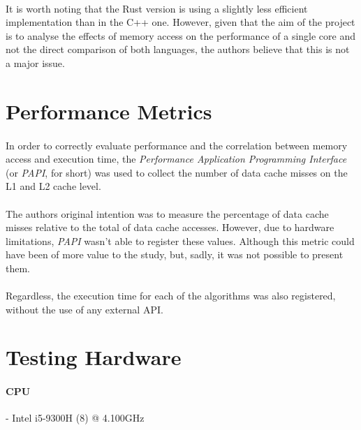 \documentclass{report}
\begin{document}
		\paragraph{}It is worth noting that the Rust version is using a slightly less efficient implementation than in the C++ one. However, given that the aim of the project is to analyse the effects of memory access on the performance of a single core and not the direct comparison of both languages, the authors believe that this is not a major issue.
	
		\section{Performance Metrics}
		
			\paragraph{}In order to correctly evaluate performance and the correlation between memory access and execution time,  the \emph{Performance Application Programming Interface} (or \emph{PAPI}, for short) was used to collect the number of data cache misses on the L1 and L2 cache level.
			
			\paragraph{}The authors original intention was to measure the percentage of data cache misses relative to the total of data cache accesses. However, due to hardware limitations, \emph{PAPI} wasn't able to register these values. Although this metric could have been of more value to the study, but, sadly, it was not possible to present them.
			
			\paragraph{}Regardless, the execution time for each of the algorithms was also registered, without the use of any external API.
			
			\clearpage
			
		\section{Testing Hardware}
		
			\paragraph{CPU}- Intel i5-9300H (8) @ 4.100GHz
\end{document}

